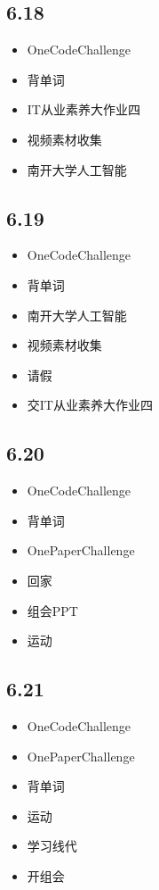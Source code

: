 \documentclass[UTF8]{ctexart}
\begin{document}
\subsection*{6.18}
\begin{itemize}
    \item OneCodeChallenge
    \item 背单词
    \item IT从业素养大作业四
    \item 视频素材收集
    \item 南开大学人工智能
\end{itemize}

\subsection*{6.19}
\begin{itemize}
    \item OneCodeChallenge
    \item 背单词
    \item 南开大学人工智能
    \item 视频素材收集
    \item 请假
    \item 交IT从业素养大作业四
\end{itemize}

\subsection*{6.20}
\begin{itemize}
    \item OneCodeChallenge
    \item 背单词
    \item OnePaperChallenge
    \item 回家
    \item 组会PPT
    \item 运动
\end{itemize}

\subsection*{6.21}
\begin{itemize}
    \item OneCodeChallenge
    \item OnePaperChallenge
    \item 背单词
    \item 运动
    \item 学习线代
    \item 开组会
\end{itemize}
\end{document}
